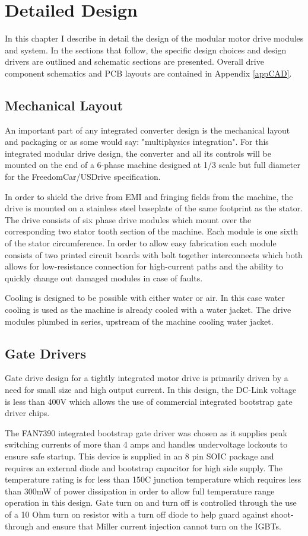 \chapter{Detailed Design}
In this chapter I describe in detail the design of the modular motor drive
modules and system.
In the sections that follow, the specific design choices and design drivers
are outlined and schematic sections are presented.
Overall drive component schematics and PCB layouts are contained in Appendix
\ref{appCAD}.

\section{Mechanical Layout}
An important part of any integrated converter design is the mechanical layout
and packaging or as some would say: "multiphysics integration".
For this integrated modular drive design, the converter and all its controls
will be mounted on the end of a 6-phase machine designed at 1/3 scale but full
diameter for the FreedomCar/USDrive specification.

In order to shield the drive from EMI and fringing fields from the machine,
the drive is mounted on a stainless steel baseplate of the same footprint as
the stator.
The drive consists of six phase drive modules which mount over the
corresponding two stator tooth section of the machine.
Each module is one sixth of the stator circumference.
In order to allow easy fabrication each module consists of two printed circuit
boards with bolt together interconnects which both allows for low-resistance
connection for high-current paths and the ability to quickly change out
damaged modules in case of faults.

Cooling is designed to be possible with either water or air.
In this case water cooling is used as the machine is already cooled with a
water jacket.
The drive modules plumbed in series, upstream of the machine cooling water
jacket.

\section{Gate Drivers}
Gate drive design for a tightly integrated motor drive is primarily driven by
a need for small size and high output current.
In this design, the DC-Link voltage is less than 400V which allows the use of
commercial integrated bootstrap gate driver chips.

The FAN7390 integrated bootstrap gate driver was chosen as it supplies peak
switching currents of more than 4 amps and handles undervoltage lockouts to
ensure safe startup.
This device is supplied in an 8 pin SOIC package and requires an external
diode and bootstrap capacitor for high side supply.
The temperature rating is for less than 150C junction temperature which
requires less than 300mW of power dissipation in order to allow full
temperature range operation in this design.
Gate turn on and turn off is controlled through the use of a 10 Ohm turn on
resistor with a turn off diode to help guard against shoot-through and ensure
that Miller current injection cannot turn on the IGBTs.

